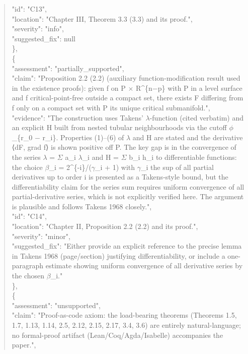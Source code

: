 \documentclass[11pt]{article}
\begin{document}
\begin{quote}
      "id": "C13",\\
      "location": "Chapter III, Theorem 3.3 (3.3) and its proof.",\\
      "severity": "info",\\
      "suggested\_fix": null\\
    \},\\
    \{\\
      "assessment": "partially\_supported",\\
      "claim": "Proposition 2.2 (2.2) (auxiliary function-modification result used in the existence proofs): given f on P \ensuremath{\times} R\^{}\{n\ensuremath{-}p\} with P in a level surface and f critical-point-free outside a compact set, there exists F differing from f only on a compact set with P its unique critical submanifold.",\\
      "evidence": "The construction uses Takens' \ensuremath{\lambda}-function (cited verbatim) and an explicit H built from nested tubular neighbourhoods via the cutoff \ensuremath{\phi}\_\{r\_0 \ensuremath{-} r\_i\}. Properties (1)--(6) of \ensuremath{\lambda} and H are stated and the derivative ⟨dF, grad f⟩ is shown positive off P. The key gap is in the convergence of the series \ensuremath{\lambda} = \ensuremath{\Sigma} a\_i \ensuremath{\lambda}\_i and H = \ensuremath{\Sigma} b\_i h\_i to differentiable functions: the choice \ensuremath{\beta}\_i = 2\^{}\{-i\}/(\ensuremath{\gamma}\_i + 1) with \ensuremath{\gamma}\_i the sup of all partial derivatives up to order i is presented as a Takens-style bound, but the differentiability claim for the series sum requires uniform convergence of all partial-derivative series, which is not explicitly verified here. The argument is plausible and follows Takens 1968 closely.",\\
      "id": "C14",\\
      "location": "Chapter II, Proposition 2.2 (2.2) and its proof.",\\
      "severity": "minor",\\
      "suggested\_fix": "Either provide an explicit reference to the precise lemma in Takens 1968 (page/section) justifying differentiability, or include a one-paragraph estimate showing uniform convergence of all derivative series by the chosen \ensuremath{\beta}\_i."\\
    \},\\
    \{\\
      "assessment": "unsupported",\\
      "claim": "Proof-as-code axiom: the load-bearing theorems (Theorems 1.5, 1.7, 1.13, 1.14, 2.5, 2.12, 2.15, 2.17, 3.4, 3.6) are entirely natural-language; no formal-proof artifact (Lean/Coq/Agda/Isabelle) accompanies the paper.",\\

\end{quote}
\end{document}
